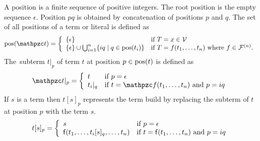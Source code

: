 \begin{definition}\label{def:position}
	A {\myem position} is a finite sequence of positive integers.
	The root position is the empty sequence $\epsilon$.
	Position $pq$ is obtained by concatenation of positions $p$ and $q$.
	The set of all positions of a term or literal is defined as 
	\begin{gather*}
	\pos(\mct) = \left\{\begin{array}{ll}
	\{ \epsilon \} 		
	& \text{if }T = x \in \mcV
	\\
	\{ \epsilon \} \cup \bigcup_{i=1}^{n} \{ iq\mid q\in\pos(t_i) \}	
	& \text{if }T=f(t_1,\ldots,t_n)\text{ where } f\in\mcF^{(n)}.
	\end{array}\right.
	\end{gather*}
The~{\myem subterm} $t|_p$ of term $t$ {\myem at position} $p\in\operatorname{pos}(t)$ is defined as
\begin{gather*}
\mct|_p = \left\{\begin{array}{ll}
		t 		& \text{if }p=\epsilon \\
		t_i|_q	& \text{if }t=\mcf(t_1,\ldots,t_n)\text{ and }p=iq
	\end{array}\right.
\end{gather*}
%
If $s$ is a term then $t[s]_p$ represents the term build by replacing the subterm of $t$ at position $p$ with the term $s$.
\begin{gather*}
t[s]_p = \left\{\begin{array}{ll}
		s 		& \text{if }p=\epsilon \\
		{\mathsf f}(t_1,\ldots,t_i[s]_q,\ldots,t_n)	& \text{if }t={\mathsf f}(t_1,\ldots,t_n)\text{ and }p=iq
	\end{array}\right.
\end{gather*}
\end{definition}

